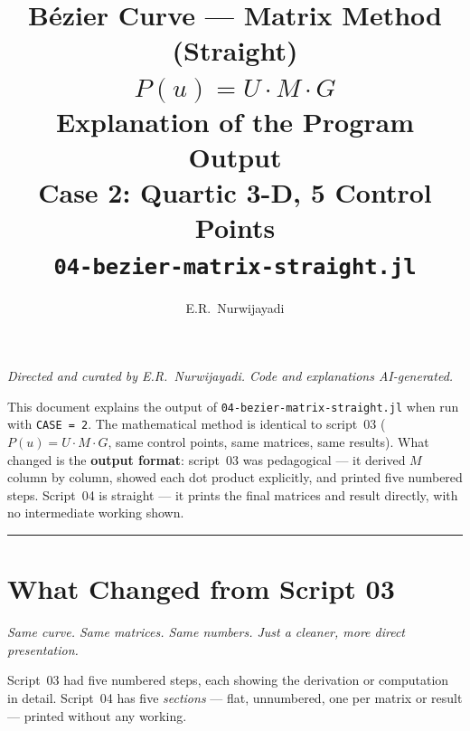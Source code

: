 \documentclass[12pt, a4paper]{article}
\title{%
  \vspace{1cm}
  {\LARGE\bfseries B\'ezier Curve --- Matrix Method (Straight)}\\[0.4em]
  {\large $P(u) = U \cdot M \cdot G$}\\[0.4em]
  {\large Explanation of the Program Output}\\[0.4em]
  {\normalsize Case 2: Quartic 3-D, 5 Control Points}\\[0.4em]
  {\normalsize\texttt{04-bezier-matrix-straight.jl}}
}
\author{E.R.\ Nurwijayadi}
\date{\DTMtoday}
\newcommand{\cd}[1]{\texttt{#1}}
\begin{document}

\maketitle
\thispagestyle{empty}

\begin{center}
\textit{Directed and curated by E.R.\ Nurwijayadi.
Code and explanations AI-generated.}
\end{center}

\begin{center}
\begin{minipage}{0.85\textwidth}
\small
This document explains the output of
\cd{04-bezier-matrix-straight.jl} when run with \cd{CASE = 2}.
The mathematical method is identical to script~03
($P(u) = U \cdot M \cdot G$, same control points, same matrices,
same results).
What changed is the \textbf{output format}: script~03 was
pedagogical --- it derived $M$ column by column, showed each
dot product explicitly, and printed five numbered steps.
Script~04 is straight --- it prints the final matrices and
result directly, with no intermediate working shown.
\end{minipage}
\end{center}

\vspace{1em}\hrule\vspace{1.5em}
\tableofcontents
\newpage


\section{What Changed from Script 03}

\textit{Same curve. Same matrices. Same numbers.
Just a cleaner, more direct presentation.}

Script~03 had five numbered steps, each showing the derivation
or computation in detail.
Script~04 has five \emph{sections} --- flat, unnumbered,
one per matrix or result --- printed without any working.
\end{document}
